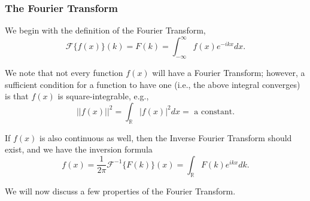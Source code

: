 %
%
\subsubsection{The Fourier Transform}

We begin with the definition of the Fourier Transform,
\begin{equation}
\label{Fourier_Transform} \mathscr{F}\{f(x)\}(k) = F(k) =  \int_{-\infty}^{\infty} f(x) e^{-ikx} dx.
\end{equation}

We note that not every function $f(x)$ will have a Fourier Transform; however, a sufficient condition for a function to have one (i.e., the above integral converges) is that $f(x)$ is square-integrable, e.g., $$||f(x)||^2 = \int_{\mathbb{R}} |f(x)|^2 dx = \mbox{ a constant}.$$ 

If $f(x)$ is also continuous as well, then the Inverse Fourier Transform should exist, and we have the inversion formula 
\begin{equation}
\label{Inverse_Fourier_Transform} f(x) =\frac{1}{2\pi} \mathscr{F}^{-1}\{ F(k) \}(x) = \int_{\mathbb{R}} F(k) e^{ikx} dk.
\end{equation}

We will now discuss a few properties of the Fourier Transform.

